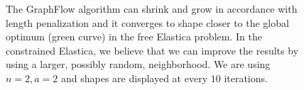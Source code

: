\begin{figure}

\caption{The GraphFlow algorithm can shrink and grow in accordance with length penalization and it converges to shape closer to the global optimum (green curve) in the free Elastica problem. In the constrained Elastica, we believe that we can improve the results by using a larger, possibly random, neighborhood. We are using $n=2,a=2$ and shapes are displayed at every $10$ iterations.}
\label{fig:graph-flow-neigh2-results}
\end{figure}

